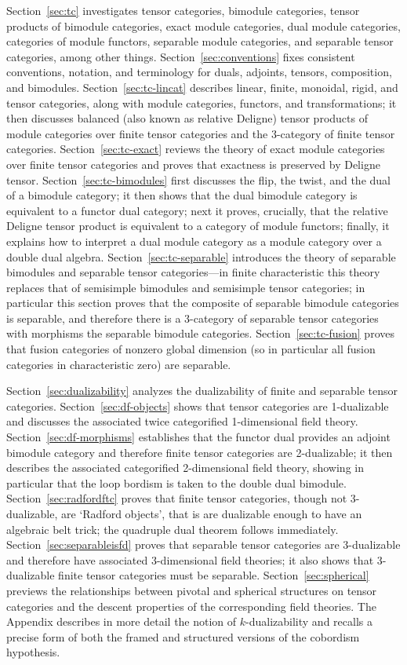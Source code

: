 \documentclass{amsart}
\begin{document}
Section~\ref{sec:tc} investigates tensor categories, bimodule categories, tensor products of bimodule categories, exact module categories, dual module categories, categories of module functors, separable module categories, and separable tensor categories, among other things.  Section~\ref{sec:conventions} fixes consistent conventions, notation, and terminology for duals, adjoints, tensors, composition, and bimodules.  Section~\ref{sec:tc-lincat} describes linear, finite, monoidal, rigid, and tensor categories, along with module categories, functors, and transformations; it then discusses balanced (also known as relative Deligne) tensor products of module categories over finite tensor categories and the 3-category of finite tensor categories.  Section~\ref{sec:tc-exact} reviews the theory of exact module categories over finite tensor categories and proves that exactness is preserved by Deligne tensor.  Section~\ref{sec:tc-bimodules} first discusses the flip, the twist, and the dual of a bimodule category; it then shows that the dual bimodule category is equivalent to a functor dual category; next it proves, crucially, that the relative Deligne tensor product is equivalent to a category of module functors; finally, it explains how to interpret a dual module category as a module category over a double dual algebra.  Section~\ref{sec:tc-separable} introduces the theory of separable bimodules and separable tensor categories---in finite characteristic this theory replaces that of semisimple bimodules and semisimple tensor categories; in particular this section proves that the composite of separable bimodule categories is separable, and therefore there is a 3-category of separable tensor categories with morphisms the separable bimodule categories.  Section~\ref{sec:tc-fusion} proves that fusion categories of nonzero global dimension (so in particular all fusion categories in characteristic zero) are separable.

Section~\ref{sec:dualizability} analyzes the dualizability of finite and separable tensor categories.  Section~\ref{sec:df-objects} shows that tensor categories are 1-dualizable and discusses the associated twice categorified 1-dimensional field theory.  Section~\ref{sec:df-morphisms} establishes that the functor dual provides an adjoint bimodule category and therefore finite tensor categories are 2-dualizable; it then describes the associated categorified 2-dimensional field theory, showing in particular that the loop bordism is taken to the double dual bimodule.  Section~\ref{sec:radfordftc} proves that finite tensor categories, though not 3-dualizable, are `Radford objects', that is are dualizable enough to have an algebraic belt trick; the quadruple dual theorem follows immediately.  Section~\ref{sec:separableisfd} proves that separable tensor categories are 3-dualizable and therefore have associated 3-dimensional field theories; it also shows that 3-dualizable finite tensor categories must be separable.  Section~\ref{sec:spherical} previews the relationships between pivotal and spherical structures on tensor categories and the descent properties of the corresponding field theories.  The Appendix describes in more detail the notion of $k$-dualizability and recalls a precise form of both the framed and structured versions of the cobordism hypothesis.
\end{document}
